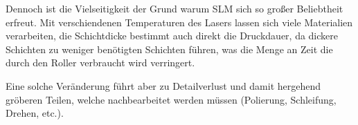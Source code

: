 \documentclass[../main.tex]{subfiles}
\begin{document}
Dennoch ist die Vielseitigkeit der Grund warum SLM sich so großer Beliebtheit erfreut. Mit verschiendenen Temperaturen des Lasers lassen sich viele Materialien verarbeiten, die Schichtdicke bestimmt auch direkt die Druckdauer, da dickere Schichten zu weniger benötigten Schichten führen, was die Menge an Zeit die durch den Roller verbraucht wird verringert.

Eine solche Veränderung führt aber zu Detailverlust und damit hergehend gröberen Teilen, welche nachbearbeitet werden müssen (Polierung, Schleifung, Drehen, etc.). 
\end{document}
